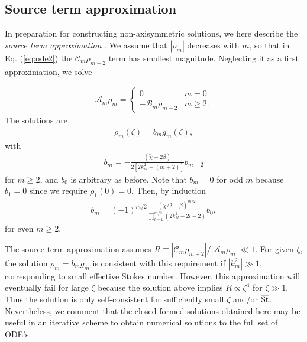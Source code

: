 \documentclass[apj]{emulateapj}
\def\blue#1{\textcolor{blue}{ #1}}
\newcommand{\Eq}[1]{Eq. (\ref{#1})}
\newcommand{\eq}[1]{\Eq{#1}}
\newcommand{\tilchi}{\tilde\chi}
\newcommand{\St}{{\rm St}}
\begin{document}
\subsection{Source term approximation}
In preparation for constructing non-axisymmetric solutions, we here describe the \emph{source term approximation} \citep{Zhang06}.
We assume that $|\rho_m|$ decreases with $m$, so that in \eq{eq:ode2} the $\mathcal{C}_m\rho_{m+2}$ term has smallest magnitude.  Neglecting it as a first approximation, we solve 

\begin{align}
\mathcal{A}_m\rho_m = \begin{cases}
        0 & m =0 \\
	-\mathcal{B}_m\rho_{m-2} & m \geq 2.
\end{cases}
\end{align}
The solutions are 
\begin{align}\label{eq:series1}
\rho_m (\zeta)= b_m g_m(\zeta),
\end{align}
with
\begin{align}
b_m  = -\frac{\left(\tilchi - 2\beta\right)}{2\left[2k_m^2 - (m+2)\right]}b_{m-2}
\end{align}
for $m\geq2$, and $b_0$ is arbitrary as before. Note that $b_m=0$ for odd $m$ because $b_1=0$ since 
we require $\rho_1^\prime(0)=0$. Then, by induction 
\begin{align}\label{eq:induction}
b_m  = \left(-1\right)^{m/2}\frac{\left(\tilchi/2-\beta\right)^{m/2}}{\prod_{l=1}^{m/2}
\left(2k_{2l}^2 -2l - 2\right)}b_0,
\end{align}
for even $m\geq 2$.  

The source term approximation assumes 
$R\equiv|\mathcal{C}_m\rho_{m+2}|/|\mathcal{A}_m\rho_m| \ll 1.$ 
For given $\zeta$, the solution $\rho_m=b_mg_m$ is consistent with this requirement if $|k_m^2|\gg1$, corresponding to small effective Stokes number.  
 However, this approximation will eventually fail for large $\zeta$ because the solution above implies $R\propto \zeta^4$ for $\zeta\gg1$. Thus the solution is only self-consistent for sufficiently small $\zeta$ and/or $\overline{\St}$. Nevertheless,
we comment that the closed-formed solutions obtained here may be useful in
an iterative scheme to obtain numerical solutions to the full set of ODE's. 
\end{document}
